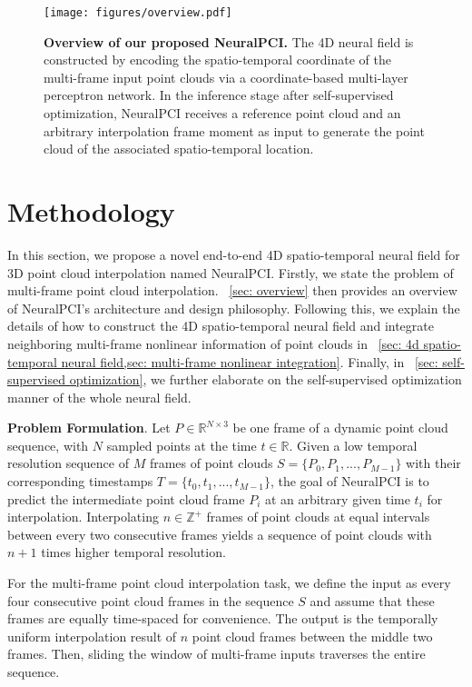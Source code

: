 \documentclass[10pt,twocolumn,letterpaper]{article}
\begin{document}
\begin{figure*}[ht]
\centering
  \texttt{[image: figures/overview.pdf]}
  \caption{\textbf{Overview of our proposed NeuralPCI.} The 4D neural field is constructed by encoding the spatio-temporal coordinate of the multi-frame input point clouds via a coordinate-based multi-layer perceptron network. In the inference stage after self-supervised optimization, NeuralPCI receives a reference point cloud and an arbitrary interpolation frame moment as input to generate the point cloud of the associated spatio-temporal location.}
  \label{fig:overview}
\vspace{-.4cm}
\end{figure*}  



\section{Methodology}
\label{sec: method}


In this section, we propose a novel end-to-end 4D spatio-temporal neural field for 3D point cloud interpolation named NeuralPCI. Firstly, we state the problem of multi-frame point cloud interpolation. ~\cref{sec: overview} then provides an overview of NeuralPCI's architecture and design philosophy. Following this, we explain the details of how to construct the 4D spatio-temporal neural field and integrate neighboring multi-frame nonlinear information of point clouds in ~\cref{sec: 4d spatio-temporal neural field,sec: multi-frame nonlinear integration}. Finally, in ~\cref{sec: self-supervised optimization}, we further elaborate on the self-supervised optimization manner of the whole neural field.

\textbf{Problem Formulation}.   
Let $P\in \mathbb{R}^{N\times3}$ be one frame of a dynamic point cloud sequence, with $N$ sampled points at the time $t\in \mathbb{R}$. Given a low temporal resolution sequence of $M$ frames of point clouds $S=\{P_{0}, P_{1}, ... ,P_{M-1}\}$ with their corresponding timestamps $T=\{t_{0}, t_{1}, ... ,t_{M-1}\}$, the goal of NeuralPCI is to predict the intermediate point cloud frame $P_{i}$ at an arbitrary given time $t_{i}$ for interpolation. Interpolating $n\in \mathbb{Z^{+}}$ frames of point clouds at equal intervals between every two consecutive frames yields a sequence of point clouds with $n+1$ times higher temporal resolution.
  
For the multi-frame point cloud interpolation task, we define the input as every four consecutive point cloud frames in the sequence $S$ and assume that these frames are equally time-spaced for convenience. The output is the temporally uniform interpolation result of $n$ point cloud frames between the middle two frames. Then, sliding the window of multi-frame inputs traverses the entire sequence.
\end{document}
